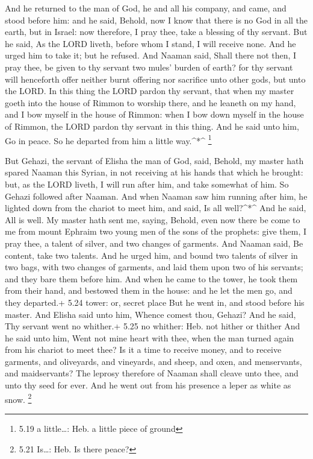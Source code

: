  And he returned to the man of God, he and all his company,
and came, and stood before him: and he said, Behold, now I know that
there is no God in all the earth, but in Israel: now therefore, I pray
thee, take a blessing of thy servant.  But he said, As the
LORD liveth, before whom I stand, I will receive none. And he urged him
to take it; but he refused.  And Naaman said, Shall there
not then, I pray thee, be given to thy servant two mules' burden of
earth? for thy servant will henceforth offer neither burnt offering nor
sacrifice unto other gods, but unto the LORD.  In this
thing the LORD pardon thy servant, that when my master goeth into the
house of Rimmon to worship there, and he leaneth on my hand, and I bow
myself in the house of Rimmon: when I bow down myself in the house of
Rimmon, the LORD pardon thy servant in this thing.  And he
said unto him, Go in peace. So he departed from him a little
way.\^{}*\^{} \footnote{5.19 a little\ldots: Heb. a little piece of
  ground}

 But Gehazi, the servant of Elisha the man of God, said,
Behold, my master hath spared Naaman this Syrian, in not receiving at
his hands that which he brought: but, as the LORD liveth, I will run
after him, and take somewhat of him.  So Gehazi followed
after Naaman. And when Naaman saw him running after him, he lighted down
from the chariot to meet him, and said, Is all well?\^{}*\^{}
 And he said, All is well. My master hath sent me, saying,
Behold, even now there be come to me from mount Ephraim two young men of
the sons of the prophets: give them, I pray thee, a talent of silver,
and two changes of garments.  And Naaman said, Be content,
take two talents. And he urged him, and bound two talents of silver in
two bags, with two changes of garments, and laid them upon two of his
servants; and they bare them before him.  And when he came
to the tower, he took them from their hand, and bestowed them in the
house: and he let the men go, and they departed.+ 5.24 tower: or, secret
place  But he went in, and stood before his master. And
Elisha said unto him, Whence comest thou, Gehazi? And he said, Thy
servant went no whither.+ 5.25 no whither: Heb. not hither or thither
 And he said unto him, Went not mine heart with thee, when
the man turned again from his chariot to meet thee? Is it a time to
receive money, and to receive garments, and oliveyards, and vineyards,
and sheep, and oxen, and menservants, and maidservants? 
The leprosy therefore of Naaman shall cleave unto thee, and unto thy
seed for ever. And he went out from his presence a leper as white as
snow. \footnote{5.21 Is\ldots: Heb. Is there peace?}

